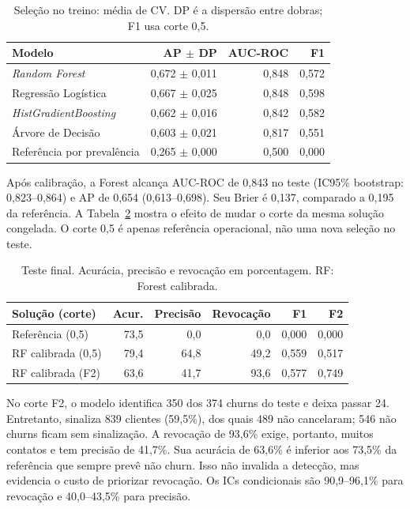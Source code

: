 \documentclass[12pt]{article}
\begin{document}
\begin{table}[htbp]
\centering\small
\caption{Seleção no treino: média de CV. DP é a dispersão entre dobras; F1 usa corte 0,5.}
\label{tab:modelos}
\begin{tabular}{lrrr}\toprule
Modelo & AP $\pm$ DP & AUC-ROC & F1\\\midrule
\textit{Random Forest} & 0,672 $\pm$ 0,011 & 0,848 & 0,572 \\
Regressão Logística & 0,667 $\pm$ 0,025 & 0,848 & 0,598 \\
\textit{HistGradientBoosting} & 0,662 $\pm$ 0,016 & 0,842 & 0,582 \\
Árvore de Decisão & 0,603 $\pm$ 0,021 & 0,817 & 0,551 \\
Referência por prevalência & 0,265 $\pm$ 0,000 & 0,500 & 0,000 \\
\bottomrule\end{tabular}
\end{table}

Após calibração, a Forest alcança AUC-ROC de 0,843 no teste (IC95\% bootstrap: 0,823--0,864) e AP de 0,654 (0,613--0,698). Seu Brier é 0,137, comparado a 0,195 da referência. A Tabela~\ref{tab:teste} mostra o efeito de mudar o corte da mesma solução congelada. O corte 0,5 é apenas referência operacional, não uma nova seleção no teste.

\begin{table}[htbp]
\centering\small
\caption{Teste final. Acurácia, precisão e revocação em porcentagem. RF: Forest calibrada.}
\label{tab:teste}
\begin{tabular}{lrrrrr}\toprule
Solução (corte) & Acur. & Precisão & Revocação & F1 & F2\\\midrule
Referência (0,5) & 73,5 & 0,0 & 0,0 & 0,000 & 0,000 \\
RF calibrada (0,5) & 79,4 & 64,8 & 49,2 & 0,559 & 0,517 \\
RF calibrada (F2) & 63,6 & 41,7 & 93,6 & 0,577 & 0,749 \\
\bottomrule\end{tabular}
\end{table}

No corte F2, o modelo identifica 350 dos 374 churns do teste e deixa passar 24. Entretanto, sinaliza 839 clientes (59,5\%), dos quais 489 não cancelaram; 546 não churns ficam sem sinalização. A revocação de 93,6\% exige, portanto, muitos contatos e tem precisão de 41,7\%. Sua acurácia de 63,6\% é inferior aos 73,5\% da referência que sempre prevê não churn. Isso não invalida a detecção, mas evidencia o custo de priorizar revocação. Os ICs condicionais são 90,9--96,1\% para revocação e 40,0--43,5\% para precisão.
\end{document}
